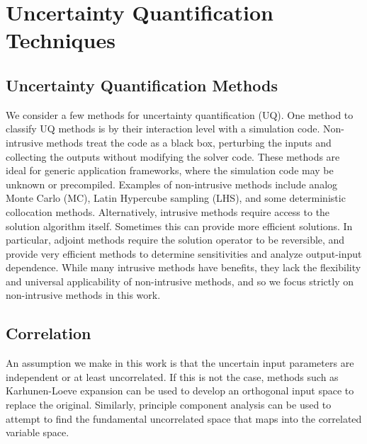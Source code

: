 
\chapter{Uncertainty Quantification Techniques} %

\label{ch:methods} %



\section{Uncertainty Quantification Methods}
We consider a few methods for uncertainty quantification (UQ).  One method to classify UQ methods is by their
interaction level with a simulation code.  Non-intrusive methods treat the code as a black box, perturbing the
inputs and collecting the outputs without modifying the solver code.  These methods are ideal for generic application
frameworks, where the simulation code may be unknown or precompiled.  Examples of non-intrusive methods
include analog Monte Carlo (MC), Latin Hypercube sampling (LHS), and some deterministic collocation methods.
Alternatively, intrusive methods require access to the solution algorithm itself.  Sometimes this can provide
more efficient solutions.  In particular, adjoint methods require the solution operator to be reversible, and
provide very efficient methods to determine sensitivities and analyze output-input dependence.  While many
intrusive methods have benefits, they lack the flexibility and universal applicability of non-intrusive
methods, and so we focus strictly on non-intrusive methods in this work.

\section{Correlation}
An assumption we make in this work is that the uncertain input parameters are independent or at least
uncorrelated.  If this is not the case, methods such as Karhunen-Loeve expansion can be used to develop an orthogonal
input space to replace the original.  Similarly, principle component analysis can be used to attempt to find
the fundamental uncorrelated space that maps into the correlated variable space.

